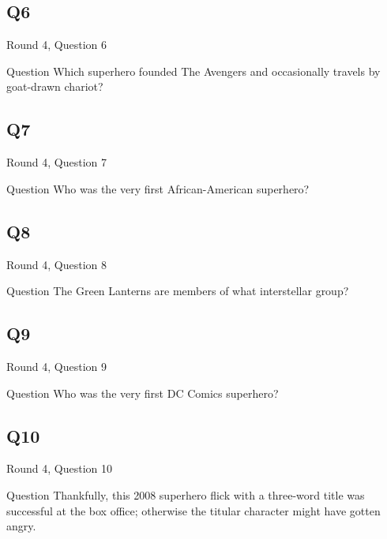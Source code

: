 \documentclass[11pt]{beamer}
\begin{document}
\subsection*{Q6}
\begin{frame}[t]{Round 4, Question 6}
\begin{block}{Question}
Which superhero founded The Avengers and occasionally travels by goat-drawn chariot?
\end{block}
\end{frame}
\subsection*{Q7}
\begin{frame}[t]{Round 4, Question 7}
\begin{block}{Question}
Who was the very first African-American superhero?
\end{block}
\end{frame}
\subsection*{Q8}
\begin{frame}[t]{Round 4, Question 8}
\begin{block}{Question}
The Green Lanterns are members of what interstellar group?
\end{block}
\end{frame}
\subsection*{Q9}
\begin{frame}[t]{Round 4, Question 9}
\begin{block}{Question}
Who was the very first DC Comics superhero?
\end{block}
\end{frame}
\subsection*{Q10}
\begin{frame}[t]{Round 4, Question 10}
\begin{block}{Question}
Thankfully, this 2008 superhero flick with a three-word title was successful at the box office; otherwise the titular character might have gotten angry.
\end{block}
\end{frame}
\end{document}
